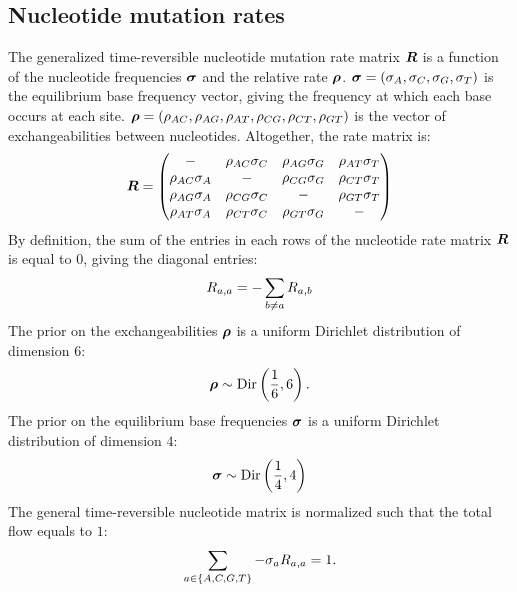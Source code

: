 \subsection{Nucleotide mutation rates}
The generalized time-reversible nucleotide mutation rate matrix $\bm{R}$ is a function of the nucleotide frequencies $\bm{\sigma}$ and the relative rate $\bm{\rho}$.
$\bm{\sigma} = (\sigma_A , \sigma_C , \sigma_G , \sigma_T)$ is the equilibrium base frequency vector, giving the frequency at which each base occurs at each site.
$\bm{\rho} = \left( \rho_{AC}, \rho_{AG}, \rho_{AT}, \rho_{CG}, \rho_{CT}, \rho_{GT}\right)$ is the vector of exchangeabilities between nucleotides.
Altogether, the rate matrix is:
\begin{equation}
    \label{eq:gtr-mutrates}
    \Mutmatrix =
    \begin{pmatrix}
        - & {\exchan_{AC}\mutequi_C} & {\exchan_{AG}\mutequi_G} & {\exchan_{AT}\mutequi_T} \\
        {\exchan_{AC}\mutequi_A} &                        - & {\exchan_{CG}\mutequi_G} & {\exchan_{CT}\mutequi_T} \\
        {\exchan_{AG}\mutequi_A} & {\exchan_{CG}\mutequi_C} &                        - & {\exchan_{GT}\mutequi_T} \\
        {\exchan_{AT}\mutequi_A} & {\exchan_{CT}\mutequi_C} & {\exchan_{GT}\mutequi_G} & -
    \end{pmatrix}
\end{equation}
By definition, the sum of the entries in each rows of the nucleotide rate matrix $\bm{R}$ is equal to $0$, giving the diagonal entries:
\begin{equation}
    R_{a,a} = - \sum\limits_{ b \neq a} R_{a,b}
\end{equation}
The \gls{prior} on the exchangeabilities $\bm{\rho}$ is a uniform Dirichlet distribution of dimension $6$:
\begin{equation}
    \label{eq:DistribExchan}
    \Exchan \sim \mathrm{Dir}\left( \dfrac{1}{6} , 6\right).
\end{equation}
The \gls{prior} on the equilibrium base frequencies $\bm{\sigma}$ is a uniform Dirichlet distribution of dimension $4$:
\begin{equation}
    \label{eq:DistribMutequi}
    \Mutequi \sim \mathrm{Dir}\left( \dfrac{1}{4} , 4\right)
\end{equation}
The general time-reversible nucleotide matrix is normalized such that the total flow equals to $1$:
\begin{equation}
    \sum\limits_{a \in \{A, C, G, T\}} - \sigma_a R_{a,a} = 1.
\end{equation}

